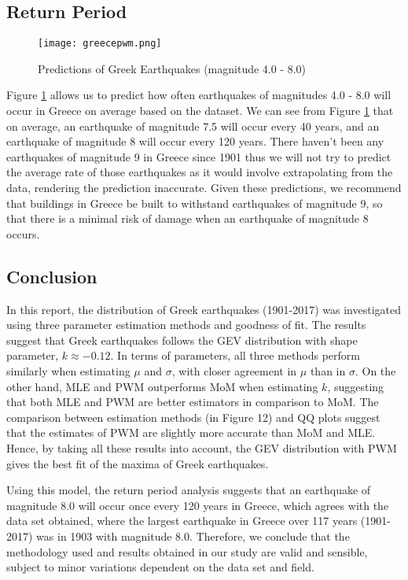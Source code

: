 \documentclass{article}
\begin{document}
\subsection{Return Period} \vspace{-0.3cm}
\begin{figure}[h]
	\centering
	\texttt{[image: greecepwm.png]}
    \vspace{-2mm}
	\caption{Predictions of Greek Earthquakes (magnitude 4.0 - 8.0)}
    \label{fig:returnperiodgreece}
\end{figure}

Figure \ref{fig:returnperiodgreece} allows us to predict how often earthquakes of magnitudes 4.0 - 8.0 will occur in Greece on average based on the dataset. We can see from Figure \ref{fig:returnperiodgreece} that on average, an earthquake of magnitude 7.5 will occur every 40 years, and an earthquake of magnitude 8 will occur every 120 years. There haven't been any earthquakes of magnitude 9 in Greece since 1901 thus we will not try to predict the average rate of those earthquakes as it would involve extrapolating from the data, rendering the prediction inaccurate. Given these predictions, we recommend that buildings in Greece be built to withstand earthquakes of magnitude 9, so that there is a minimal risk of damage when an earthquake of magnitude 8 occurs.
\newpage\vspace{-0.3cm}
\subsection{Conclusion}\vspace{-0.2cm}
In this report, the distribution of Greek earthquakes (1901-2017) was investigated using three parameter estimation methods and goodness of fit. The results suggest that Greek earthquakes follows the GEV distribution with shape parameter, $k \approx -0.12$. In terms of parameters, all three methods perform similarly when estimating $\mu$ and $\sigma$, with closer agreement in $\mu$ than in $\sigma$. On the other hand, MLE and PWM outperforms MoM when estimating $k$, suggesting that both MLE and PWM are better estimators in comparison to MoM. The comparison between estimation methods (in Figure 12) and QQ plots suggest that the estimates of PWM are slightly more accurate than MoM and MLE. Hence, by taking all these results into account, the GEV distribution with PWM gives the best fit of the maxima of Greek earthquakes.

Using this model, the return period analysis suggests that an earthquake of magnitude 8.0 will occur once every 120 years in Greece, which agrees with the data set obtained, where the largest earthquake in Greece over 117 years (1901-2017) was in 1903 with magnitude 8.0. Therefore, we conclude that the methodology used and results obtained in our study are valid and sensible, subject to minor variations dependent on the data set and field. 
\end{document}
